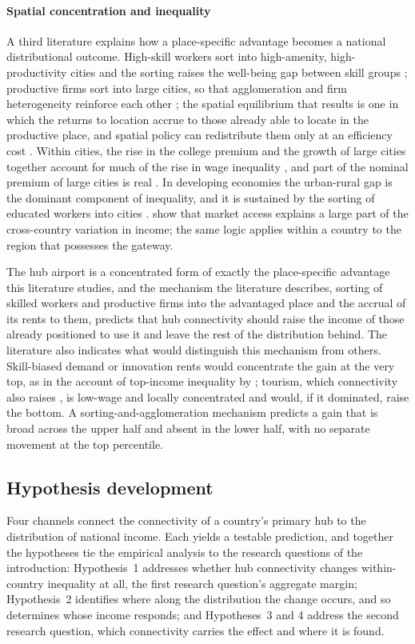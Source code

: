 \paragraph{Spatial concentration and inequality}
A third literature explains how a place-specific advantage becomes a national distributional outcome. High-skill workers sort into high-amenity, high-productivity cities and the sorting raises the well-being gap between skill groups \citep{Diamond_2016}; productive firms sort into large cities, so that agglomeration and firm heterogeneity reinforce each other \citep{Gaubert_2018}; the spatial equilibrium that results is one in which the returns to location accrue to those already able to locate in the productive place, and spatial policy can redistribute them only at an efficiency cost \citep{Fajgelbaum_2020}. Within cities, the rise in the college premium and the growth of large cities together account for much of the rise in wage inequality \citep{BaumSnow_2018}, and part of the nominal premium of large cities is real \citep{Moretti_2013}. In developing economies the urban-rural gap is the dominant component of inequality, and it is sustained by the sorting of educated workers into cities \citep{Young_2013}. \citet{Redding_2004} show that market access explains a large part of the cross-country variation in income; the same logic applies within a country to the region that possesses the gateway.

The hub airport is a concentrated form of exactly the place-specific advantage this literature studies, and the mechanism the literature describes, sorting of skilled workers and productive firms into the advantaged place and the accrual of its rents to them, predicts that hub connectivity should raise the income of those already positioned to use it and leave the rest of the distribution behind. The literature also indicates what would distinguish this mechanism from others. Skill-biased demand or innovation rents would concentrate the gain at the very top, as in the account of top-income inequality by \citet{Aghion_2018}; tourism, which connectivity also raises \citep{Khadaroo_2008}, is low-wage and locally concentrated \citep{Faber_2019} and would, if it dominated, raise the bottom. A sorting-and-agglomeration mechanism predicts a gain that is broad across the upper half and absent in the lower half, with no separate movement at the top percentile.

\subsection{Hypothesis development}
\label{sec:framework}
Four channels connect the connectivity of a country's primary hub to the distribution of national income. Each yields a testable prediction, and together the hypotheses tie the empirical analysis to the research questions of the introduction: Hypothesis~1 addresses whether hub connectivity changes within-country inequality at all, the first research question's aggregate margin; Hypothesis~2 identifies where along the distribution the change occurs, and so determines whose income responds; and Hypotheses~3 and 4 address the second research question, which connectivity carries the effect and where it is found.

